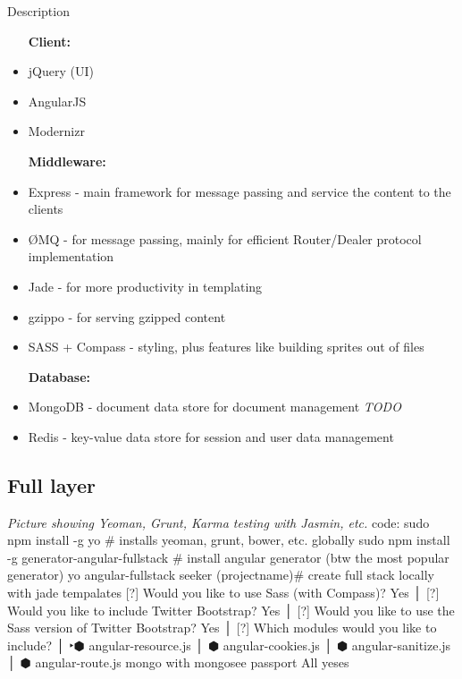 \documentclass[11pt, a4paper]{report}
\begin{document}
Description
\begin{itemize}
\item [\textbf{Client:}]
  \item jQuery (UI)
  \item AngularJS
  \item Modernizr

\item [\textbf{Middleware:}]  
  \item Express - main framework for message passing and service the content to the clients
  \item {\O}MQ - for message passing, mainly for efficient Router/Dealer protocol implementation
  \item Jade - for more productivity in templating
  \item gzippo - for serving gzipped content
  \item SASS + Compass - styling, plus features like building sprites out of files

\item [\textbf{Database:}]
  \item MongoDB - document data store for document management \emph{TODO}
  \item Redis - key-value data store for session and user data management
\end{itemize}

\subsection{Full layer}
\emph{Picture showing Yeoman, Grunt, Karma testing with Jasmin, etc.}
code: sudo npm install -g yo \# installs yeoman, grunt, bower, etc. globally
sudo npm install -g generator-angular-fullstack \# install angular generator (btw the most popular generator)
yo angular-fullstack seeker (projectname)\# create full stack locally with jade tempalates
[?] Would you like to use Sass (with Compass)? Yes                               │
[?] Would you like to include Twitter Bootstrap? Yes                             │
[?] Would you like to use the Sass version of Twitter Bootstrap? Yes             │
[?] Which modules would you like to include?                                     │
‣⬢ angular-resource.js                                                           │
 ⬢ angular-cookies.js                                                            │
 ⬢ angular-sanitize.js                                                           │
 ⬢ angular-route.js 
 mongo with mongosee
 passport 
 All yeses
\end{document}
